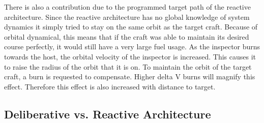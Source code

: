 \documentclass[journal, 10pt]{IEEEtran}
\begin{document}
There is also a contribution due to the programmed target path of the reactive architecture.  Since the reactive architecture has no global knowledge of system dynamics it simply tried to stay on the same orbit as the target craft.  Because of orbital dynamical, this means that if the craft was able to maintain its desired course perfectly, it would still have a very large fuel usage.  As the inspector burns towards the host, the orbital velocity of the inspector is increased.  This causes it to raise the radius of the orbit that it is on.  To maintain the orbit of the target craft, a burn is requested to compensate.  Higher delta V burns will magnify this effect.  Therefore this effect is also increased with distance to target.

\subsection{Deliberative vs. Reactive Architecture}
\end{document}
